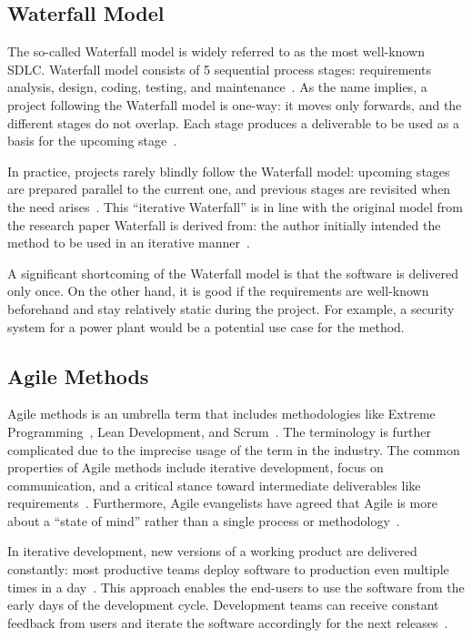 \subsection{Waterfall Model}

The so-called Waterfall model is widely referred to as the most well-known SDLC. Waterfall model consists of 5 sequential process stages: requirements analysis, design, coding, testing, and maintenance~\cite{alshamrani_comparison_2015}. As the name implies, a project following the Waterfall model is one-way: it moves only forwards, and the different stages do not overlap. Each stage produces a deliverable to be used as a basis for the upcoming stage~\cite{balaji_waterfall_2012}. 

In practice, projects rarely blindly follow the Waterfall model: upcoming stages are prepared parallel to the current one, and previous stages are revisited when the need arises~\cite{sommerville_software_2016}. This ``iterative Waterfall'' is in line with the original model from the research paper Waterfall is derived from: the author initially intended the method to be used in an iterative manner~\cite{royce_managing_1970}.

A significant shortcoming of the Waterfall model is that the software is delivered only once. On the other hand, it is good if the requirements are well-known beforehand and stay relatively static during the project. For example, a security system for a power plant would be a potential use case for the method.

\subsection{Agile Methods}

Agile methods is an umbrella term that includes methodologies like Extreme Programming~\cite{wells_don_extreme_2018}, Lean Development, and Scrum~\cite{scrumorg_home_2022}. The terminology is further complicated due to the imprecise usage of the term in the industry. The common properties of Agile methods include iterative development, focus on communication, and a critical stance toward intermediate deliverables like requirements~\cite{cohen_introduction_2004}. Furthermore, Agile evangelists have agreed that Agile is more about a ``state of mind'' rather than a single process or methodology~\cite{cohen_introduction_2004}.

In iterative development, new versions of a working product are delivered constantly: most productive teams deploy software to production even multiple times in a day~\cite{forsgren_accelerate_2018}. This approach enables the end-users to use the software from the early days of the development cycle. Development teams can receive constant feedback from users and iterate the software accordingly for the next releases~\cite{balaji_waterfall_2012}.

